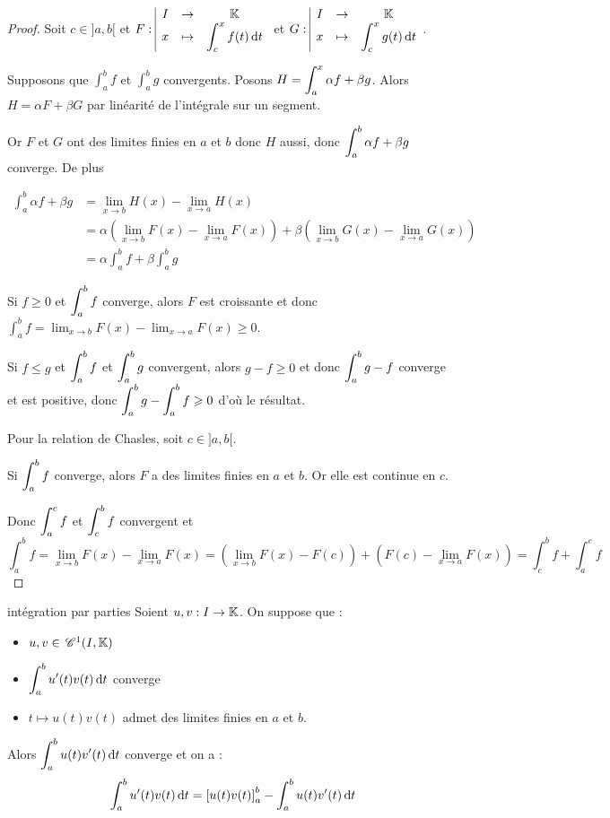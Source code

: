 \begin{proof}
    Soit $c \in ]a, b[$ et $F: \space \begin{array}{|ccc} \displaystyle I & \to & \displaystyle \mathbb{K} \\ \displaystyle x & \mapsto & \displaystyle \int_c^x f (t) \,\mathrm{d}t \end{array}$ et $G: \space \begin{array}{|ccc} \displaystyle I & \to & \displaystyle \mathbb{K} \\ \displaystyle x & \mapsto & \displaystyle \int_c^x g(t) \,\mathrm{d}t \end{array}$.

    Supposons que $\int_{a }^{b } f$ et $\int_{a }^{b } g$ convergents. Posons 
    $H = \displaystyle \int_{a }^{x } \alpha f + \beta g$. Alors $H = \alpha F + \beta G$ par 
    linéarité de l'intégrale sur un segment. 

    Or $F$ et $G$ ont des limites finies en $a$ et $b$ donc $H$ aussi, donc
    $\displaystyle \int_{a }^{b } \alpha f + \beta g$ converge.
    De plus 

    \begin{align}
        \int_{a }^{b } \alpha f + \beta g &= \lim_{x \to b} H(x) - \lim_{x \to a} H(x) \\
        &= \alpha \left( \lim_{x \to b} F(x) - \lim_{x \to a} F(x) \right) + \beta \left( \lim_{x \to b} G(x) - \lim_{x \to a} G(x) \right) \\
        &= \alpha \int_{a }^{b } f + \beta \int_{a }^{b } g
    \end{align}

    \lvspace Si $f \geqslant 0$ et $\displaystyle \int_{a }^{b } f$ converge, alors 
    $F$ est croissante et donc $\int_{a}^b f = \lim_{x \to b} F(x) - \lim_{x \to a} F(x) \geqslant 0$.

    \lvspace Si $f \leqslant g$ et $\displaystyle \int_{a }^{b } f$ et $\displaystyle \int_{a }^{b } g$ convergent, alors 
    $g - f \geqslant 0$ et donc $\displaystyle \int_{a }^{b } g - f$ converge et est positive, donc
    $\displaystyle \int_{a }^{b } g - \int_{a }^{b } f \geqslant 0$ d'où le résultat.

    \lvspace Pour la relation de Chasles, soit $c \in ]a, b[$.

    Si $\displaystyle \int_{a }^{b } f$ converge, alors $F$ a des limites finies en $a$ et $b$. Or elle 
    est continue en $c$. 

    Donc $\displaystyle \int_{a }^{c }f$ et $\displaystyle \int_{c }^{b } f$ convergent et
    $$ \int_{a }^{b } f = \lim_{x \to b} F(x) - \lim_{x \to a} F(x) = \left( \lim_{x \to b} F(x) - F(c) \right) + \left( F(c) - \lim_{x \to a} F(x) \right) = \int_{c }^{b } f + \int_{a }^{c } f $$
\end{proof}

\begin{theoreme}{intégration par parties}{}
    Soient $u, v : I \to \mathbb{K} $. On suppose que :
    \begin{itemize}
        \item $u, v \in  \,\mathscr C^{1} (I, \mathbb{K})$
        \item $\displaystyle \int_{a }^{b } u'(t) v(t) \,\mathrm{d}t$ converge
        \item $t \mapsto u(t) v(t)$ admet des limites finies en $a$ et $b$.
    \end{itemize} 

    Alors $\displaystyle \int_a^b u(t) v'(t) \,\mathrm{d}t$ converge et on a :
    $$ \int_a^b u'(t) v(t) \,\mathrm{d}t = \left[ u(t) v(t) \right]_a^b - \int_a^b u(t) v'(t) \,\mathrm{d}t $$
\end{theoreme}


